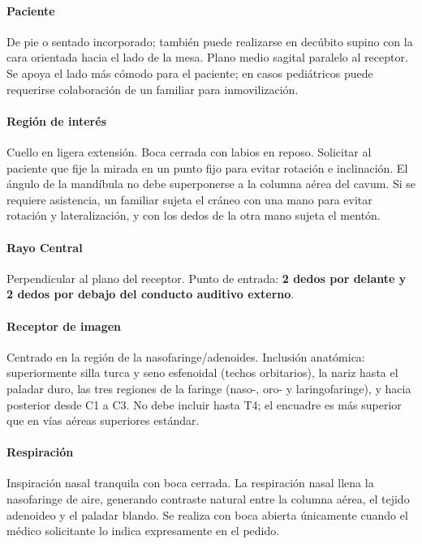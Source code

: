 \paragraph{Paciente}
De pie o sentado incorporado; también puede realizarse en decúbito supino con la cara orientada hacia el lado de la mesa. Plano medio sagital paralelo al receptor. Se apoya el lado más cómodo para el paciente; en casos pediátricos puede requerirse colaboración de un familiar para inmovilización.

\paragraph{Región de interés}
Cuello en ligera extensión. Boca cerrada con labios en reposo. Solicitar al paciente que fije la mirada en un punto fijo para evitar rotación e inclinación. El ángulo de la mandíbula no debe superponerse a la columna aérea del cavum. Si se requiere asistencia, un familiar sujeta el cráneo con una mano para evitar rotación y lateralización, y con los dedos de la otra mano sujeta el mentón.

\paragraph{Rayo Central}
Perpendicular al plano del receptor. Punto de entrada: \textbf{2 dedos por delante y 2 dedos por debajo del conducto auditivo externo}.

\paragraph{Receptor de imagen}
Centrado en la región de la nasofaringe/adenoides. Inclusión anatómica: superiormente silla turca y seno esfenoidal (techos orbitarios), la nariz hasta el paladar duro, las tres regiones de la faringe (naso-, oro- y laringofaringe), y hacia posterior desde C1 a C3. No debe incluir hasta T4; el encuadre es más superior que en vías aéreas superiores estándar.

\paragraph{Respiración}
Inspiración nasal tranquila con boca cerrada. La respiración nasal llena la nasofaringe de aire, generando contraste natural entre la columna aérea, el tejido adenoideo y el paladar blando. Se realiza con boca abierta únicamente cuando el médico solicitante lo indica expresamente en el pedido.

